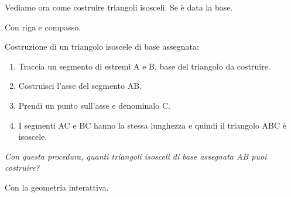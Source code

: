 \begin{comment}
 
Con riga e compasso.

\begin{procedura}[Triangolo equilatero]\label{proc:fonda_equilatero}
  Dati due punti A e B, si deve costruire un punto C in modo che ABC sia un 
triangolo equilatero:
  \begin{enumerate} [nosep]
    \item 
    Traccia i punti A e B.
    \item 
    Traccia la circonferenza di centro A e passante per B.
    \item 
    Traccia la circonferenza di centro B e passante per A.
    \item 
    Individua un punto C di intersezione delle due circonferenze.
    \item 
    Il poligono ABC è il triangolo richiesto.    
  \end{enumerate}
\end{procedura}

\ifcoding
Con la geometria interattiva.

\fi

\end{comment}

Vediamo ora come costruire triangoli isosceli. Se è data la base.

Con riga e compasso.

\begin{procedura}
  Costruzione di un triangolo isoscele di base assegnata:
  \begin{enumerate} [nosep]
    \item 
    Traccia un segmento di estremi A e B, base del triangolo da costruire.
    \item 
    Costruisci l'asse del segmento AB.
    \item 
    Prendi un punto sull'asse e denominalo C.
    \item 
    I segmenti AC e BC hanno la stessa lunghezza e quindi il triangolo ABC è 
isoscele.
  \end{enumerate}
\textit{ Con questa procedura, quanti triangoli isosceli di base assegnata AB 
puoi costruire?}  
\end{procedura}

\ifcoding
Con la geometria interattiva.

\fi

